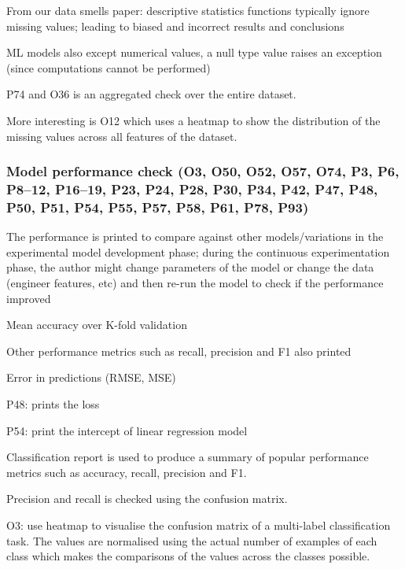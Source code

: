From our data smells paper: descriptive statistics functions typically ignore missing values; leading to biased and incorrect results and conclusions

ML models also except numerical values, a null type value raises an exception (since computations cannot be performed)

P74 and O36 is an aggregated check over the entire dataset.

More interesting is O12 which uses a heatmap to show the distribution of the missing values across all features of the dataset.

\subsubsection{Model performance check (O3, O50, O52, O57, O74, P3, P6, P8--12, P16--19, P23, P24, P28, P30, P34, P42, P47, P48, P50, P51, P54, P55, P57, P58, P61, P78, P93)}

The performance is printed to compare against other models/variations in the experimental model development phase; during the continuous experimentation phase, the author might change parameters of the model or change the data (engineer features, etc) and then re-run the model to check if the performance improved

Mean accuracy over K-fold validation

Other performance metrics such as recall, precision and F1 also printed

Error in predictions (RMSE, MSE)

P48: prints the loss

P54: print the intercept of linear regression model

Classification report is used to produce a summary of popular performance metrics such as accuracy, recall, precision and F1.

Precision and recall is checked using the confusion matrix.

O3: use heatmap to visualise the confusion matrix of a multi-label classification task. The values are normalised using the actual number of examples of each class which makes the comparisons of the values across the classes possible.

